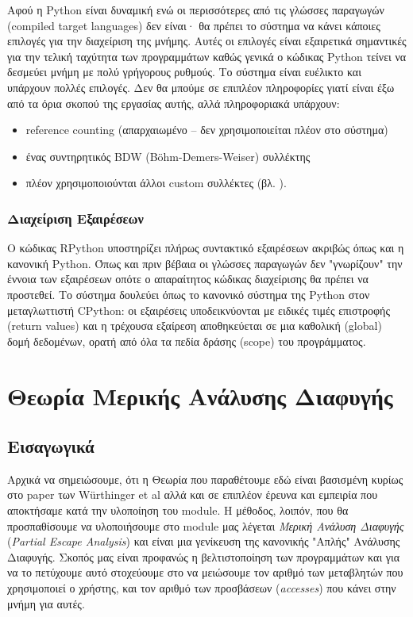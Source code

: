 Αφού η Python είναι δυναμική ενώ οι περισσότερες από τις γλώσσες παραγωγών
(compiled target languages) δεν είναι· θα πρέπει το σύστημα να κάνει κάποιες
επιλογές για την διαχείριση της μνήμης. Αυτές οι επιλογές είναι εξαιρετικά
σημαντικές για την τελική ταχύτητα των προγραμμάτων καθώς γενικά ο κώδικας
Python τείνει να δεσμεύει μνήμη με πολύ γρήγορους ρυθμούς. Το σύστημα είναι
ευέλικτο και υπάρχουν πολλές επιλογές. Δεν θα μπούμε σε επιπλέον πληροφορίες
γιατί είναι έξω από τα όρια σκοπού της εργασίας αυτής, αλλά πληροφοριακά
υπάρχουν:

\begin{itemize}
\item reference counting (απαρχαιωμένο – δεν χρησιμοποιείται πλέον στο σύστημα)
\item ένας συντηρητικός BDW (B\"ohm-Demers-Weiser) συλλέκτης\cite{bdw}
\item πλέον χρησιμοποιούνται άλλοι custom συλλέκτες (βλ. \cite{gc}).
\end{itemize}

\subsubsection{Διαχείριση Εξαιρέσεων}

Ο κώδικας RPython υποστηρίζει πλήρως συντακτικό εξαιρέσεων ακριβώς όπως και η
κανονική Python. Όπως και πριν βέβαια οι γλώσσες παραγωγών δεν "γνωρίζουν" την
έννοια των εξαιρέσεων οπότε ο απαραίτητος κώδικας διαχείρισης θα πρέπει να
προστεθεί. Το σύστημα δουλεύει όπως το κανονικό σύστημα της Python στον
μεταγλωττιστή CPython: οι εξαιρέσεις υποδεικνύονται με ειδικές τιμές επιστροφής
(return values) και η τρέχουσα εξαίρεση αποθηκεύεται σε μια καθολική (global)
δομή δεδομένων, ορατή από όλα τα πεδία δράσης (scope) του προγράμματος.


\pagebreak
\section{Θεωρία Μερικής Ανάλυσης Διαφυγής}

\subsection{Εισαγωγικά}

Αρχικά να σημειώσουμε, ότι η Θεωρία που παραθέτουμε εδώ είναι βασισμένη κυρίως
στο paper των W{\"u}rthinger et al\cite{stadler2014partial} αλλά και σε επιπλέον
έρευνα και εμπειρία που αποκτήσαμε κατά την υλοποίηση του module. Η μέθοδος,
λοιπόν, που θα προσπαθίσουμε να υλοποιήσουμε στο module μας λέγεται
\textit{Μερική Ανάλυση Διαφυγής} (\textit{Partial Escape Analysis}) και είναι
μια γενίκευση της κανονικής "Απλής" Ανάλυσης Διαφυγής. Σκοπός μας είναι προφανώς
η βελτιστοποίηση των προγραμμάτων και για να το πετύχουμε αυτό στοχεύουμε στο να
μειώσουμε τον αριθμό των μεταβλητών που χρησιμοποιεί ο χρήστης, και τον αριθμό
των προσβάσεων (\textit{accesses}) που κάνει στην μνήμη για αυτές.

